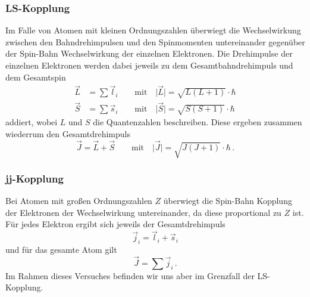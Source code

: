         \subsubsection{LS-Kopplung}
            Im Falle von Atomen mit kleinen Ordnungszahlen überwiegt die Wechselwirkung zwischen
            den Bahndrehimpulsen und den Spinmomenten untereinander gegenüber der Spin-Bahn Wechselwirkung der einzelnen Elektronen.
            Die Drehimpulse der einzelnen Elektronen werden dabei jeweils zu dem Gesamtbahndrehimpuls und dem Gesamtspin
            \begin{align}
                \vec{L}&=\sum\vec{l}_i \qquad\text{mit}\quad \vert\vec{L}\vert=\sqrt{L(L+1)}\cdot\hbar \\
                \vec{S}&=\sum\vec{s}_i \qquad\text{mit}\quad \vert\vec{S}\vert=\sqrt{S(S+1)}\cdot\hbar
            \end{align}
            addiert, wobei $L$ und $S$ die Quantenzahlen beschreiben.
            Diese ergeben zusammen wiederrum den Gesamtdrehimpuls
            \begin{equation}
                \vec{J}=\vec{L}+\vec{S} \qquad\text{mit}\quad \vert\vec{J}\vert=\sqrt{J(J+1)}\cdot\hbar \, .
            \end{equation}
        \subsubsection{jj-Kopplung}
            Bei Atomen mit großen Ordnungszahlen $Z$ überwiegt die Spin-Bahn Kopplung der Elektronen der Wechselwirkung untereinander,
            da diese proportional zu $Z$ ist.
            Für jedes Elektron ergibt sich jeweils der Gesamtdrehimpuls
            \begin{equation}
                \vec{j}_i=\vec{l}_i+\vec{s}_i 
            \end{equation}
            und für das gesamte Atom gilt
            \begin{equation}
                \vec{J}=\sum\vec{j}_i \, .
            \end{equation}
        Im Rahmen dieses Versuches befinden wir uns aber im Grenzfall der LS-Kopplung.
